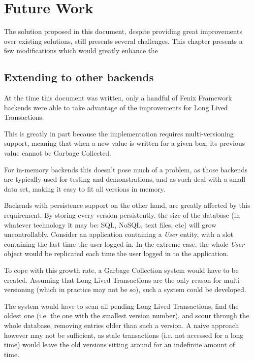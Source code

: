 \chapter{Future Work}

The solution proposed in this document, despite providing great
improvements over existing solutions, still presents several
challenges. This chapter presents a few modifications which would
greatly enhance the 

\section{Extending to other backends}

At the time this document was written, only a handful of Fenix
Framework backends were able to take advantage of the improvements for
Long Lived Transactions.

This is greatly in part because the implementation requires
multi-versioning support, meaning that when a new value is written for
a given box, its previous value cannot be Garbage Collected. 

For in-memory backends this doesn't pose much of a problem, as those
backends are typically used for testing and demonstrations, and as
such deal with a small data set, making it easy to fit all versions in
memory. 

Backends with persistence support on the other hand, are greatly
affected by this requirement. By storing every version persistently,
the size of the database (in whatever technology it may be: SQL,
NoSQL, text files, etc) will grow uncontrollably. Consider an
application containing a {\it User} entity, with a slot containing the
last time the user logged in. In the extreme case, the whole {\it
  User} object would be replicated each time the user logged in to the
application.

To cope with this growth rate, a Garbage Collection system would have
to be created. Assuming that Long Lived Transactions are the only
reason for multi-versioning (which in practice may not be so), such a
system could be developed.

The system would have to scan all pending Long Lived Transactions,
find the oldest one (i.e. the one with the smallest version number),
and scour through the whole database, removing entries older than such
a version. A naive approach however may not be sufficient, as stale
transactions (i.e. not accessed for a long time) would leave the old
versions sitting around for an indefinite amount of time.

